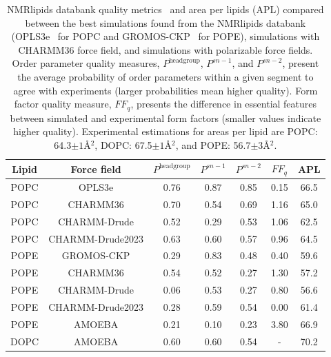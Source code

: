 \documentclass[journal=jacsat,manuscript=article,layout=singlecolumn]{achemso}
\begin{document}
\begin{table}[]
    \centering
    \begin{tabular}{c c c c c c c}
        Lipid & Force field & $P^{\mathrm{headgroup}}$ & $P^{sn-1}$ & $P^{sn-2}$ & $FF_{q}$ & APL \\
        \hline
        POPC & OPLS3e       & 0.76 & 0.87 & 0.85 & 0.15 & 66.5\\
        POPC & CHARMM36     & 0.70 & 0.54 & 0.69 & 1.16 & 65.0\\
        POPC & CHARMM-Drude & 0.52 & 0.29 & 0.53 & 1.06 & 62.5\\
        POPC & CHARMM-Drude2023 & 0.63 & 0.60 & 0.57 & 0.96 & 64.5\\
        \hline
        POPE & GROMOS-CKP & 0.29 & 0.83 & 0.48 & 0.40 & 59.6\\
        POPE & CHARMM36   & 0.54 & 0.52 & 0.27 & 1.30 & 57.2 \\
        POPE & CHARMM-Drude & 0.06 & 0.53 & 0.27 & 0.80 & 56.6  \\
        POPE & CHARMM-Drude2023 & 0.28 & 0.59 & 0.54 & 0.00 & 61.4  \\
        POPE & AMOEBA & 0.21 & 0.10 & 0.23 & 3.80 & 66.9\\
        \hline
        DOPC & AMOEBA & 0.60 & 0.60 & 0.54 & - & 70.2\\
    \end{tabular}
    \caption{NMRlipids databank quality metrics~\cite{Databank} and area per lipids (APL) compared between the best simulations found from the NMRlipids databank (OPLS3e~\cite{roos19} for POPC and GROMOS-CKP~\cite{Chandrasekhar03,kukol09,piggot12} for POPE), simulations with CHARMM36 force field, and simulations with polarizable force fields. Order  parameter quality measures, $P^{\mathrm{headgroup}}$, $P^{sn-1}$, and $P^{sn-2}$, present the average probability of order parameters within a given segment to agree with experiments (larger probabilities mean higher quality). Form factor quality measure, $FF_{q}$, presents the difference in essential features between simulated and experimental form factors (smaller values indicate higher quality). Experimental estimations for areas per lipid are POPC: 64.3$\pm1$\AA$^{2}$\cite{kucerka2011}, DOPC: 67.5$\pm1$\AA$^{2}$\cite{kucerka2008}, and POPE: 56.7$\pm$3\AA$^{2}$\cite{Rickeard2020}.}
    \label{tab:my_label}
\end{table}
\end{document}
